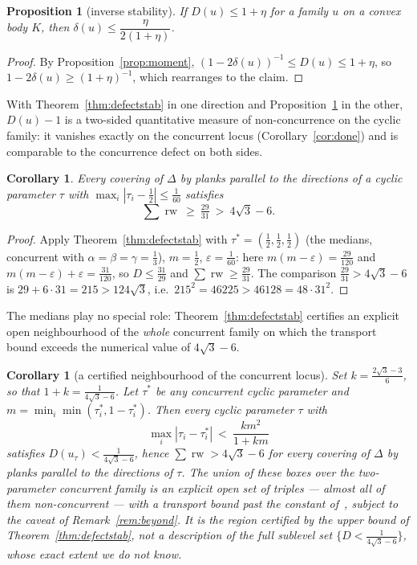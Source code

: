 \documentclass{aims}
\numberwithin{equation}{section}
\theoremstyle{plain}
\newtheorem{proposition}[theorem]{Proposition}
\newtheorem{corollary}[theorem]{Corollary}
\theoremstyle{definition}
\theoremstyle{remark}
\newcommand{\rw}{\operatorname{rw}}
\begin{document}
\begin{proposition}[inverse stability]\label{prop:invstab}
If $D(u)\le1+\eta$ for a family $u$ on a convex body $K$, then
$\delta(u)\le\dfrac{\eta}{2(1+\eta)}$.
\end{proposition}

\begin{proof}
By Proposition~\ref{prop:moment}, $(1-2\delta(u))^{-1}\le D(u)\le1+\eta$, so
$1-2\delta(u)\ge(1+\eta)^{-1}$, which rearranges to the claim.
\end{proof}

With Theorem~\ref{thm:defectstab} in one direction and
Proposition~\ref{prop:invstab} in the other, $D(u)-1$ is a two-sided
quantitative measure of non-concurrence on the cyclic family: it vanishes
exactly on the concurrent locus (Corollary~\ref{cor:done}) and is comparable
to the concurrence defect on both sides.

\begin{corollary}\label{cor:beyond}
Every covering of $\Delta$ by planks parallel to the directions of a cyclic
parameter $\tau$ with $\max_i|\tau_i-\tfrac12|\le\tfrac1{60}$ satisfies
\[
\sum\rw\ \ge\ \tfrac{29}{31}\ >\ 4\sqrt3-6 .
\]
\end{corollary}

\begin{proof}
Apply Theorem~\ref{thm:defectstab} with $\tau^*=(\tfrac12,\tfrac12,\tfrac12)$
(the medians, concurrent with $\alpha=\beta=\gamma=\tfrac13$), $m=\tfrac12$,
$\varepsilon=\tfrac1{60}$: here $m(m-\varepsilon)=\tfrac{29}{120}$ and
$m(m-\varepsilon)+\varepsilon=\tfrac{31}{120}$, so
$D\le\tfrac{31}{29}$ and $\sum\rw\ge\tfrac{29}{31}$. The comparison
$\tfrac{29}{31}>4\sqrt3-6$ is $29+6\cdot31=215>124\sqrt3$, i.e.\
$215^2=46225>46128=48\cdot31^2$.
\end{proof}

The medians play no special role: Theorem~\ref{thm:defectstab} certifies an
explicit open neighbourhood of the \emph{whole} concurrent family on which
the transport bound exceeds the numerical value of $4\sqrt3-6$.

\begin{corollary}[a certified neighbourhood of the concurrent locus]
\label{cor:region}
Set $k=\tfrac{2\sqrt3-3}6$, so that $1+k=\tfrac1{4\sqrt3-6}$. Let $\tau^*$ be
any concurrent cyclic parameter and $m=\min_i\min(\tau_i^*,1-\tau_i^*)$. Then
every cyclic parameter $\tau$ with
\[
\max_i|\tau_i-\tau_i^*|\ <\ \frac{km^2}{1+km}
\]
satisfies $D(u_\tau)<\tfrac1{4\sqrt3-6}$, hence $\sum\rw>4\sqrt3-6$ for every
covering of $\Delta$ by planks parallel to the directions of $\tau$. The
union of these boxes over the two-parameter concurrent family is an explicit
open set of triples --- almost all of them non-concurrent --- with a
transport bound past the constant of~\cite{BY26}, subject to the caveat of
Remark~\ref{rem:beyond}. It is the region certified by the upper bound of
Theorem~\ref{thm:defectstab}, not a description of the full sublevel set
$\{D<\tfrac1{4\sqrt3-6}\}$, whose exact extent we do not know.
\end{corollary}
\end{document}

